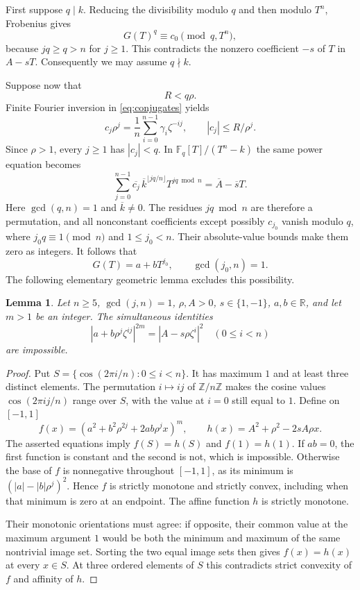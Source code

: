 \documentclass[11pt,letterpaper]{article}
\newtheorem{lemma}[theorem]{Lemma}
\theoremstyle{remark}\newtheorem{remark}[theorem]{Remark}
\newcommand{\Z}{\mathbb Z}
\newcommand{\R}{\mathbb R}
\newcommand{\F}{\mathbb F}
\begin{document}
First suppose $q\mid k$. Reducing the divisibility modulo $q$ and then
modulo $T^n$, Frobenius gives
\[
 G(T)^q\equiv c_0\pmod{q,T^n},
\]
because $jq\ge q>n$ for $j\ge1$. This contradicts the nonzero coefficient
$-s$ of $T$ in $A-sT$. Consequently we may assume $q\nmid k$.

Suppose now that
\begin{equation}\label{eq:small}
                            R<q\rho.
\end{equation}
Finite Fourier inversion in \eqref{eq:conjugates} yields
\[
 c_j\rho^j=\frac1n\sum_{i=0}^{n-1}\gamma_i\zeta^{-ij},\qquad
 |c_j|\le R/\rho^j.
\]
Since $\rho>1$, every $j\ge1$ has $|c_j|<q$.
In $\F_q[T]/(T^n-k)$ the same power equation becomes
\begin{equation}\label{eq:frob}
 \sum_{j=0}^{n-1}\overline{c_j}\,
 \overline{k}^{\lfloor jq/n\rfloor}T^{jq\bmod n}=\overline A-\overline sT.
\end{equation}
Here $\gcd(q,n)=1$ and $\overline k\ne0$. The residues $jq\bmod n$ are
therefore a permutation, and all nonconstant coefficients except possibly
$c_{j_0}$ vanish modulo $q$, where $j_0q\equiv1\pmod n$ and $1\le j_0<n$.
Their absolute-value bounds make them zero as integers. It follows that
\[
                  G(T)=a+bT^{j_0},\qquad \gcd(j_0,n)=1.
\]
The following elementary geometric lemma excludes this possibility.

\begin{lemma}\label{lem:circle}
Let $n\ge5$, $\gcd(j,n)=1$, $\rho,A>0$, $s\in\{1,-1\}$,
$a,b\in\R$, and let $m>1$ be an integer. The simultaneous identities
\[
 |a+b\rho^j\zeta^{ij}|^{2m}=|A-s\rho\zeta^i|^2
 \quad(0\le i<n)
\]
are impossible.
\end{lemma}
\begin{proof}
Put $S=\{\cos(2\pi i/n):0\le i<n\}$. It has maximum $1$ and at least
three distinct elements. The permutation $i\mapsto ij$ of $\Z/n\Z$ makes the cosine values
$\cos(2\pi ij/n)$ range over $S$, with the value at $i=0$ still equal to $1$.
Define on $[-1,1]$
\[
 f(x)=(a^2+b^2\rho^{2j}+2ab\rho^j x)^m,
 \qquad h(x)=A^2+\rho^2-2sA\rho x.
\]
The asserted equations imply $f(S)=h(S)$ and $f(1)=h(1)$.
If $ab=0$, the first function is constant and the second is not, which is
impossible. Otherwise the base of $f$ is nonnegative throughout $[-1,1]$,
as its minimum is $(|a|-|b|\rho^j)^2$. Hence $f$ is strictly monotone and
strictly convex, including when that minimum is zero at an endpoint.
The affine function $h$ is strictly monotone.

Their monotonic orientations must agree: if opposite, their common value
at the maximum argument $1$ would be both the minimum and maximum of the
same nontrivial image set. Sorting the two equal image sets then gives
$f(x)=h(x)$ at every $x\in S$. At three ordered elements of $S$ this
contradicts strict convexity of $f$ and affinity of $h$.
\end{proof}
\end{document}
